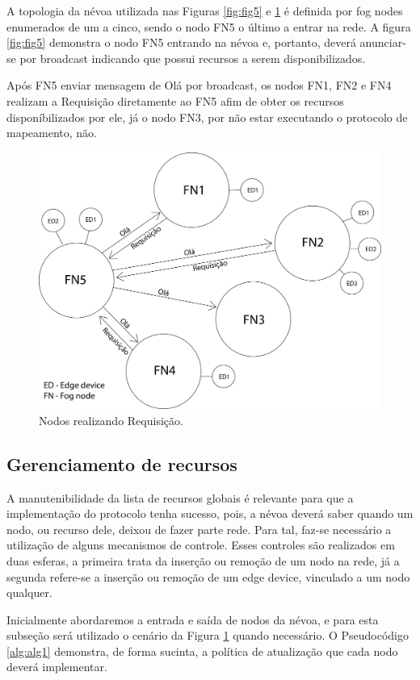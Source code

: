 A topologia da névoa utilizada nas Figuras \ref{fig:fig5} e \ref{fig:fig6} é definida por fog nodes enumerados de um a cinco, sendo o nodo FN5 o último a entrar na rede.
A figura \ref{fig:fig5} demonstra o nodo FN5 entrando na névoa e, portanto, deverá anunciar-se por broadcast indicando que possui recursos a serem disponibilizados.

Após FN5 enviar mensagem de Olá por broadcast, os nodos FN1, FN2 e FN4 realizam a Requisição diretamente ao FN5 afim de obter os recursos disponíbilizados por ele,
já o nodo FN3, por não estar executando o protocolo de mapeamento, não.

\begin{figure}[H]
    \centering\includegraphics[width=.5\textwidth]{fig6.png}
    \caption%
    {\label{fig:fig6} Nodos realizando Requisição.}
\end{figure}


\subsection{Gerenciamento de recursos}

A manutenibilidade da lista de recursos globais é relevante para que a implementação do protocolo tenha sucesso, pois, a névoa deverá saber quando um nodo, ou recurso dele, deixou de fazer parte rede.
Para tal, faz-se necessário a utilização de alguns mecanismos de controle.
Esses controles são realizados em duas esferas, a primeira trata da inserção ou remoção de um nodo na rede,
já a segunda refere-se a inserção ou remoção de um edge device, vinculado a um nodo qualquer.



Inicialmente abordaremos a entrada e saída de nodos da névoa, e para esta subseção será utilizado o cenário da Figura \ref{fig:fig6} quando necessário.
O Pseudocódigo \ref{alg:alg1} demonstra, de forma sucinta, a política de atualização que cada nodo deverá implementar.


